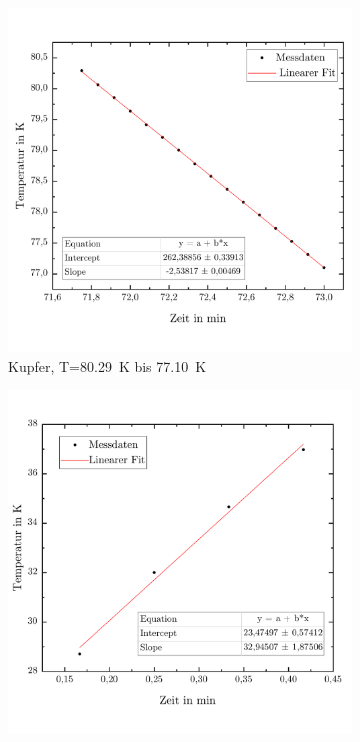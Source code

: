 \documentclass[parskip=half, a4paper,twoside,final]{article}
\begin{document}
\begin{figure}[ht!]
\begin{subfigure}[b!]{0.49\textwidth}
    \includegraphics[width=\textwidth]{Bilder/77_1__80_29_Abfall.pdf}
    \vspace{-1cm}
    \caption{Kupfer, T=\SI{80,29}{\kelvin} bis \SI{77,10}{\kelvin}}
  \end{subfigure}
  \begin{subfigure}[b!]{0.49\textwidth}
    \vspace{-.5cm}
    \includegraphics[width=\textwidth]{Bilder/28_71__36_97__Anstieg.pdf}

\end{subfigure}
\end{figure}
\end{document}
